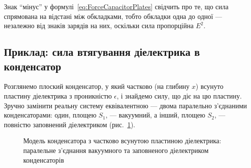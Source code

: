 \begin{Attention}
	Знак \enquote{мінус} у формулі~\eqref{eq:ForceCapacitorPlates} свідчить про те, що сила спрямована на  відстані між обкладками, тобто
	обкладки  одна до одної --- незалежно від знаків зарядів на них, оскільки сила пропорційна $E^2$.
\end{Attention}

\subsection*{Приклад: сила втягування діелектрика в конденсатор}

Розглянемо плоский конденсатор, у який частково (на глибину $x$) всунуто пластину діелектрика з проникністю $\epsilon$, і знайдемо силу, що діє на
цю пластину. Зручно замінити реальну систему еквівалентною --- двома паралельно з'єднаними конденсаторами: один, площею $S_1$, --- вакуумний, а
інший, площею $S_2$, --- повністю заповнений діелектриком (рис.~\ref{pic:DielectricInCapacitor}).

\begin{figure}[h!]\centering
	\caption{Модель конденсатора з частково всунутою пластиною діелектрика: паралельне з'єднання
		вакуумного та заповненого діелектриком конденсаторів\label{pic:DielectricInCapacitor}}
\end{figure}

